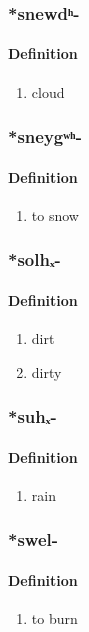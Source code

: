 \subsubsection{\**snewdʰ-}
\paragraph{Definition}
\begin{enumerate}
\item cloud
\end{enumerate}
\subsubsection{\**sneygʷʰ-}
\paragraph{Definition}
\begin{enumerate}
\item to snow
\end{enumerate}
\subsubsection{\**solhₓ-}
\paragraph{Definition}
\begin{enumerate}
\item dirt
\item dirty
\end{enumerate}
\subsubsection{\**suhₓ-}
\paragraph{Definition}
\begin{enumerate}
\item rain
\end{enumerate}
\subsubsection{\**swel-}
\paragraph{Definition}
\begin{enumerate}
\item to burn
\end{enumerate}
